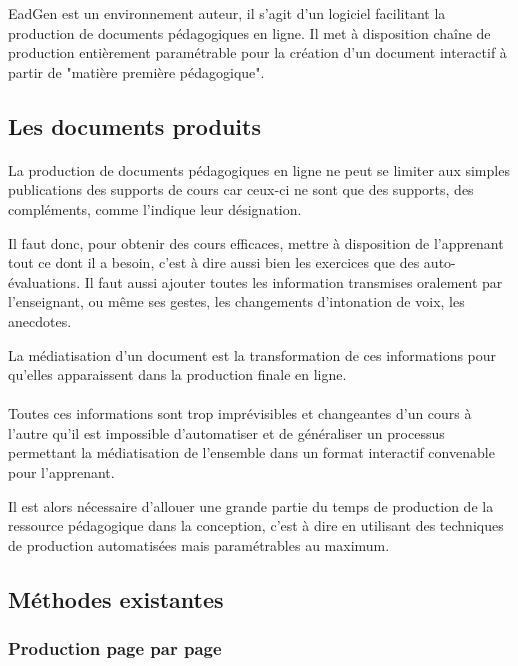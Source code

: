 EadGen est un environnement auteur, il s'agit d'un logiciel facilitant la production de documents pédagogiques en ligne. Il met à disposition chaîne de production entièrement paramétrable pour la création d'un document interactif à partir de "matière première pédagogique".

\subsection{Les documents produits}

\paragraph{}La production de documents pédagogiques en ligne ne peut se limiter aux simples publications des supports de cours car ceux-ci ne sont que des supports, des compléments, comme l'indique leur désignation. 

Il faut donc, pour obtenir des cours efficaces, mettre à disposition de l'apprenant tout ce dont il a besoin, c'est à dire aussi bien les exercices que des auto-évaluations. Il faut aussi ajouter toutes les information transmises oralement par l'enseignant, ou même ses gestes, les changements d'intonation de voix, les anecdotes. 

La médiatisation d'un document est la transformation de ces informations pour qu'elles apparaissent dans la production finale en ligne. 

\paragraph{}Toutes ces informations sont trop imprévisibles et changeantes d'un cours à l'autre qu'il est impossible d'automatiser et de généraliser un processus permettant la médiatisation de l'ensemble dans un format interactif convenable pour l'apprenant. 

Il est alors nécessaire d’allouer une grande partie du temps de production de la ressource pédagogique dans la conception, c'est à dire en utilisant des techniques de production automatisées mais paramétrables au maximum.

\subsection{Méthodes existantes}
\subsubsection{Production page par page}
